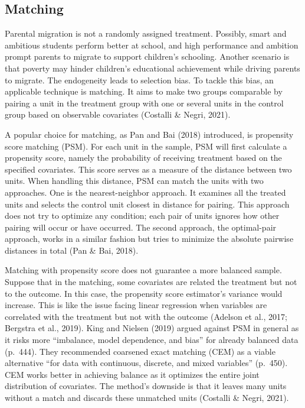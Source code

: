 \documentclass[
  man,floatsintext]{apa7}
\begin{document}
\newpage

\hypertarget{matching}{%
\subsection{Matching}\label{matching}}

Parental migration is not a randomly assigned treatment. Possibly, smart and ambitious students perform better at school, and high performance and ambition prompt parents to migrate to support children's schooling. Another scenario is that poverty may hinder children's educational achievement while driving parents to migrate. The endogeneity leads to selection bias. To tackle this bias, an applicable technique is matching. It aims to make two groups comparable by pairing a unit in the treatment group with one or several units in the control group based on observable covariates (Costalli \& Negri, 2021).

A popular choice for matching, as Pan and Bai (2018) introduced, is propensity score matching (PSM). For each unit in the sample, PSM will first calculate a propensity score, namely the probability of receiving treatment based on the specified covariates. This score serves as a measure of the distance between two units. When handling this distance, PSM can match the units with two approaches. One is the nearest-neighbor approach. It examines all the treated units and selects the control unit closest in distance for pairing. This approach does not try to optimize any condition; each pair of units ignores how other pairing will occur or have occurred. The second approach, the optimal-pair approach, works in a similar fashion but tries to minimize the absolute pairwise distances in total (Pan \& Bai, 2018).

Matching with propensity score does not guarantee a more balanced sample. Suppose that in the matching, some covariates are related the treatment but not to the outcome. In this case, the propensity score estimator's variance would increase. This is like the issue facing linear regression when variables are correlated with the treatment but not with the outcome (Adelson et al., 2017; Bergstra et al., 2019). King and Nielsen (2019) argued against PSM in general as it risks more ``imbalance, model dependence, and bias'' for already balanced data (p.~444). They recommended coarsened exact matching (CEM) as a viable alternative ``for data with continuous, discrete, and mixed variables'' (p.~450). CEM works better in achieving balance as it optimizes the entire joint distribution of covariates. The method's downside is that it leaves many units without a match and discards these unmatched units (Costalli \& Negri, 2021).
\end{document}
